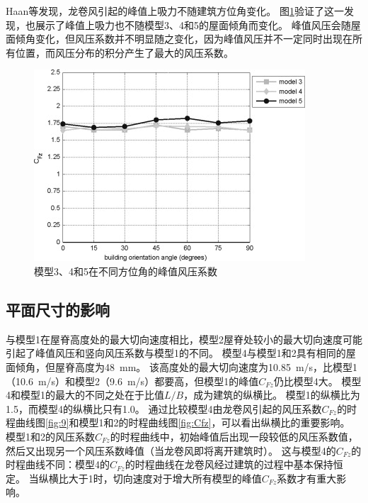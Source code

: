 \documentclass{ctexart}
\begin{document}
Haan等\cite{haan2009tornado}发现，龙卷风引起的峰值上吸力不随建筑方位角变化。
图\ref{fig:uplift}验证了这一发现，也展示了峰值上吸力也不随模型3、4和5的屋面倾角而变化。
峰值风压会随屋面倾角变化，但风压系数并不明显随之变化，因为峰值风压并不一定同时出现在所有位置，而风压分布的积分产生了最大的风压系数。
\begin{figure}[h]
\centering
\includegraphics{./fig/8.jpg}
\caption{模型3、4和5在不同方位角的峰值风压系数}
\label{fig:uplift}
\end{figure}

\subsection{平面尺寸的影响}
与模型1在屋脊高度处的最大切向速度相比，模型2屋脊处较小的最大切向速度可能引起了峰值风压和竖向风压系数与模型1的不同。
模型4与模型1和2具有相同的屋面倾角，但屋脊高度为\SI{48}{mm}。
该高度处的最大切向速度为\SI{10.85}{m/s}，比模型1（\SI{10.6}{m/s}）和模型2（\SI{9.6}{m/s}）都要高，但模型1的峰值$C_{Fz}$仍比模型4大。
模型4和模型1的最大的不同之处在于比值$L/B$，成为建筑的纵横比。
模型1的纵横比为\num{1.5}，而模型4的纵横比只有\num{1.0}。
通过比较模型4由龙卷风引起的风压系数$C_{Fz}$的时程曲线图\ref{fig:9}和模型1和2的时程曲线图\ref{fig:Cfz}，可以看出纵横比的重要影响。
模型1和2的风压系数$C_{Fz}$的时程曲线中，初始峰值后出现一段较低的风压系数值，然后又出现另一个风压系数峰值（当龙卷风即将离开建筑时）。
这与模型4的$C_{Fz}$的时程曲线不同：模型4的$C_{Fz}$的时程曲线在龙卷风经过建筑的过程中基本保持恒定。
当纵横比大于1时，切向速度对于增大所有模型的峰值$C_{Fz}$系数才有重大影响。
\end{document}
